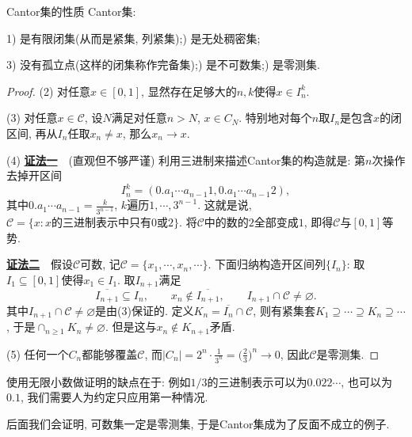 \begin{proposition}{Cantor集的性质}
	Cantor集: 
	
	1) 是有限闭集(从而是紧集, 列紧集);) 是无处稠密集;
	
	3) 没有孤立点(这样的闭集称作完备集);) 是不可数集;) 是零测集. 
\end{proposition}
\begin{proof}
	(2) 对任意$x \in [0,1]$, 显然存在足够大的$n,k$使得$x \in I_n^k$. 
	
	(3) 对任意$x \in \mathcal{C}$, 设$N$满足对任意$n>N$, $x \in C_N$. 特别地对每个$n$取$I_n$是包含$x$的闭区间, 再从$I_n$任取$x_n \neq x$, 那么$x_n \to x$. 
	
	(4) \underline{\textbf{证法一}}~~(直观但不够严谨) 利用三进制来描述Cantor集的构造就是: 第$n$次操作去掉开区间$$I_n^k =  (0.a_1\cdots a_{n-1}1, 0.a_1\cdots a_{n-1}2),$$其中$0.a_1\cdots a_{n-1}=\frac{k}{3^{n-1}}$, $k$遍历$1,\cdots ,3^{n-1}$. 这就是说, $\mathcal{C} = \{ x:x\textit{的三进制表示中只有$0$或$2$} \}$. 将$\mathcal{C}$中的数的$2$全部变成$1$, 即得$\mathcal{C}$与$[0,1]$等势. 
	
	\underline{\textbf{证法二}}~~假设$\mathcal{C}$可数, 记$\mathcal{C} = \{ x_1,\cdots ,x_n,\cdots \}$. 下面归纳构造开区间列$\{ I_n \}$: 取$I_1 \subseteq [0,1]$使得$x_1 \in I_1$. 取$I_{n+1}$满足$$\overline{I_{n+1}} \subseteq I_n,\qquad x_n \notin \overline{I_{n+1}},\qquad I_{n+1} \cap \mathcal{C} \neq \varnothing .$$
	其中$I_{n+1} \cap \mathcal{C} \neq \varnothing$是由(3)保证的. 定义$K_n = \overline{I_n} \cap \mathcal{C}$, 则有紧集套$K_1 \supseteq \cdots \supseteq K_n \supseteq \cdots$, 于是$\cap_{n \geq 1}K_n \neq \varnothing$. 但是这与$x_n \notin K_{n+1}$矛盾. 
	
	(5) 任何一个$C_n$都能够覆盖$\mathcal{C}$, 而$|C_n| = 2^n \cdot \frac{1}{3^n} = \big( \frac{2}{3} \big)^n \to 0$, 因此$\mathcal{C}$是零测集. 
\end{proof}
\begin{remark}
	使用无限小数做证明的缺点在于: 例如$1/3$的三进制表示可以为$0.022\cdots$, 也可以为$0.1$, 我们需要人为约定只应用第一种情况. 
\end{remark}
\begin{remark}
	后面我们会证明, 可数集一定是零测集, 于是Cantor集成为了反面不成立的例子. 
\end{remark}










